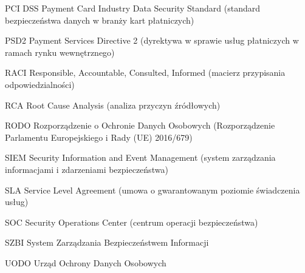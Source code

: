 \begin{abbreviations}
    \item[PCI DSS] Payment Card Industry Data Security Standard (standard bezpieczeństwa danych w branży kart płatniczych)
    \item[PSD2]    Payment Services Directive 2 (dyrektywa w sprawie usług płatniczych w ramach rynku wewnętrznego)
    \item[RACI]    Responsible, Accountable, Consulted, Informed (macierz przypisania odpowiedzialności)
    \item[RCA]     Root Cause Analysis (analiza przyczyn źródłowych)
    \item[RODO]    Rozporządzenie o Ochronie Danych Osobowych (Rozporządzenie Parlamentu Europejskiego i Rady (UE) 2016/679)
    \item[SIEM]    Security Information and Event Management (system zarządzania informacjami i zdarzeniami bezpieczeństwa)
    \item[SLA]     Service Level Agreement (umowa o gwarantowanym poziomie świadczenia usług)
    \item[SOC]     Security Operations Center (centrum operacji bezpieczeństwa)
    \item[SZBI]    System Zarządzania Bezpieczeństwem Informacji
    \item[UODO]    Urząd Ochrony Danych Osobowych
\end{abbreviations}
